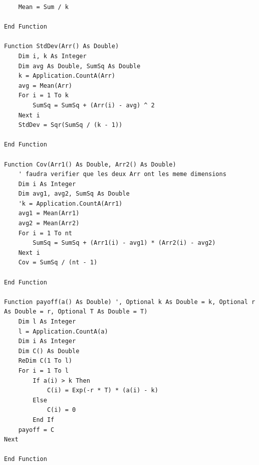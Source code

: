 \documentclass[a4paper,12pt]{scrartcl}
\begin{document}
\begin{lstlisting}
    Mean = Sum / k

End Function

Function StdDev(Arr() As Double)
    Dim i, k As Integer
    Dim avg As Double, SumSq As Double
    k = Application.CountA(Arr)
    avg = Mean(Arr)
    For i = 1 To k
        SumSq = SumSq + (Arr(i) - avg) ^ 2
    Next i
    StdDev = Sqr(SumSq / (k - 1))

End Function

Function Cov(Arr1() As Double, Arr2() As Double)
    ' faudra verifier que les deux Arr ont les meme dimensions
    Dim i As Integer
    Dim avg1, avg2, SumSq As Double
    'k = Application.CountA(Arr1)
    avg1 = Mean(Arr1)
    avg2 = Mean(Arr2)
    For i = 1 To nt
        SumSq = SumSq + (Arr1(i) - avg1) * (Arr2(i) - avg2)
    Next i
    Cov = SumSq / (nt - 1)

End Function

Function payoff(a() As Double) ', Optional k As Double = k, Optional r As Double = r, Optional T As Double = T)
    Dim l As Integer
    l = Application.CountA(a)
    Dim i As Integer
    Dim C() As Double
    ReDim C(1 To l)
    For i = 1 To l
        If a(i) > k Then
            C(i) = Exp(-r * T) * (a(i) - k)
        Else
            C(i) = 0
        End If
    payoff = C
Next

End Function


\end{lstlisting}
\end{document}
